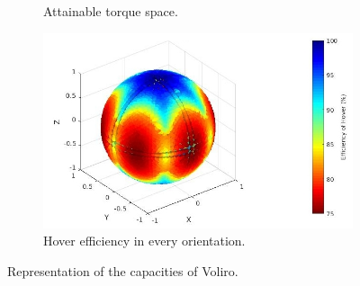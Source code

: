 \begin{figure}[!h]
{\begin{subfigure}[b]{0.5\textwidth}
    \caption{Attainable torque space.} \label{fig:voliro_tspace}
  \end{subfigure}
  \begin{subfigure}[b]{0.45\textwidth}
    \includegraphics[width=\linewidth]{images/Voliro_hspace.jpg}
    \caption{Hover efficiency in every orientation.} \label{fig:voliro_hspace}
  \end{subfigure}}
  \caption{Representation of the capacities of Voliro.}
  \label{fig:Voliro_spaces}
\end{figure}

\begin{table}[!h]
\begin{center}
 \caption{Comparison between the two designs' force capabilities.}\vspace{1ex}
 \label{tab:tab_Hexa_compare_force}
\end{center}
\end{table}

\begin{table}[!h]
\begin{center}
 \caption{Comparison between the two designs' torque capabilities.}\vspace{1ex}
 \label{tab:tab_Hexa_compare_torque}
\end{center}
\end{table}

